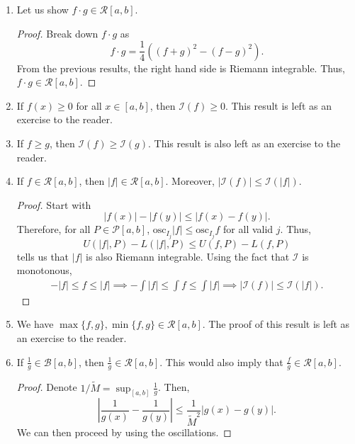 \documentclass[15pt,a4paper]{book}
\theoremstyle{definition}
\newcommand{\abs}[1]{\left| #1 \right|} %
\newcommand{\cP}{\mathcal{P}}
\newcommand{\cR}{\mathcal{R}}
\newcommand{\cB}{\mathcal{B}}
\newcommand{\cI}{\mathcal{I}}
\newcommand{\osc}{\text{osc}}
\begin{document}
\begin{enumerate}
\item Let us show $f \cdot g \in \cR[a,b]$.
\begin{proof}
    Break down $f \cdot g$ as
    \begin{equation}
        f \cdot g = \frac{1}{4}\left( (f+g)^{2} - (f-g)^{2}\right).
    \end{equation}
    From the previous results, the right hand side is Riemann integrable. Thus, $f \cdot g \in \cR[a,b]$.
\end{proof}

\item If $f(x) \geq 0$ for all $x \in [a,b]$, then $\cI(f) \geq 0$. This result is left as an exercise to the reader.

\item If $f \geq g$, then $\cI(f) \geq \cI(g)$. This result is also left as an exercise to the reader.

\item If $f \in \cR[a,b]$, then $\abs{f} \in \cR[a,b]$. Moreover, $\abs{\cI(f)} \leq \cI(\abs{f})$.
\begin{proof}
    Start with
    \begin{equation}
        \abs{f(x)}-\abs{f(y)} \leq \abs{f(x)-f(y)}.
    \end{equation}
    Therefore, for all $P \in \cP[a,b]$, $\osc_{I_{j}} \abs{f} \leq \osc_{I_{j}} f$ for all valid $j$. Thus,
    \begin{equation}
        U(\abs{f},P) - L(\abs{f},P) \leq U(f,P) - L(f,P)
    \end{equation}
    tells us that $\abs{f}$ is also Riemann integrable. Using the fact that $\cI$ is monotonous,
    \begin{align}
        -\abs{f} \leq f \leq \abs{f} \implies -\int \abs{f} \leq \int f \leq \int \abs{f} \implies \abs{\cI(f)} \leq \cI(\abs{f}).
    \end{align}
\end{proof}

\item We have $\max\{f,g\},\min\{f,g\} \in \cR[a,b]$. The proof of this result is left as an exercise to the reader.

\item If $\frac{1}{g} \in \cB[a,b]$, then $\frac{1}{g} \in \cR[a,b]$. This would also imply that $\frac{f}{g} \in \cR[a,b]$.
\begin{proof}
    Denote $1/\tilde{M} = \sup_{[a,b]} \frac{1}{g}$. Then,
    \begin{equation}
        \abs{\frac{1}{g(x)} - \frac{1}{g(y)}} \leq \frac{1}{\tilde{M}^{2}} \abs{g(x)-g(y)}.
    \end{equation}
    We can then proceed by using the oscillations.
\end{proof}


\end{enumerate}
\end{document}
